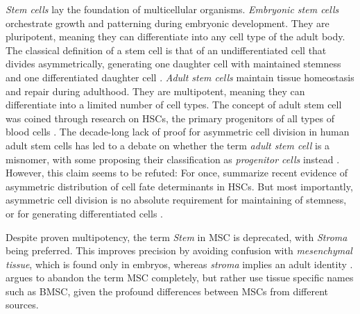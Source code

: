 \emph{Stem cells} lay the foundation of multicellular organisms. %
\emph{Embryonic stem cells} orchestrate growth and patterning during embryonic
development. They are pluripotent, meaning they can differentiate into any cell
type of the adult body. The classical definition of a stem cell is that of an
undifferentiated cell that divides asymmetrically, generating one daughter cell
with maintained stemness and one differentiated daughter cell
\cite{cooperCellProliferationDevelopment2000, shenghuiMechanismsStemCell2009}.
\emph{Adult stem cells} 
maintain tissue homeostasis and repair during adulthood. They are multipotent,
meaning they can differentiate into a limited number of cell types. The concept
of adult stem cell was coined through research on \acp{HSC}, the primary
progenitors of all types of blood cells \cite{leeHematopoieticStemCells2019,
    nunesAsymmetricCellDivision2024}. The decade-long lack of proof for asymmetric
cell division in human adult stem cells has led to a debate on whether the term
\emph{adult stem cell} is a misnomer, with some proposing their classification
as \emph{progenitor cells} instead \cite{bhartiyaStemCellsProgenitors2015}.
However, this claim seems to be refuted: For once,
\citet{nunesAsymmetricCellDivision2024} summarize recent evidence of asymmetric
distribution of cell fate determinants in \acp{HSC}. But most importantly,
asymmetric cell division is no absolute requirement for maintaining of
stemness, or for
generating differentiated cells \cite{morrisonStemCellsNiches2008,
    yamashitaPolarityStemCell2010, shahriyariSymmetricVsAsymmetric2013,
    nakamuraAsymmetricitySisterCells2018}.

Despite proven multipotency, the term \emph{Stem} in \ac{MSC} is deprecated,
with \emph{Stroma} being preferred. This improves precision by avoiding
confusion with \emph{mesenchymal tissue}, which is found only in embryos,
whereas \emph{stroma} implies an adult identity
\cite{robeyMesenchymalStemCells2017}. \citet{robeyMesenchymalStemCells2017}
argues to abandon the term MSC completely, but rather use tissue specific names
such as \ac{BMSC}, given the profound differences between MSCs from different
sources.


